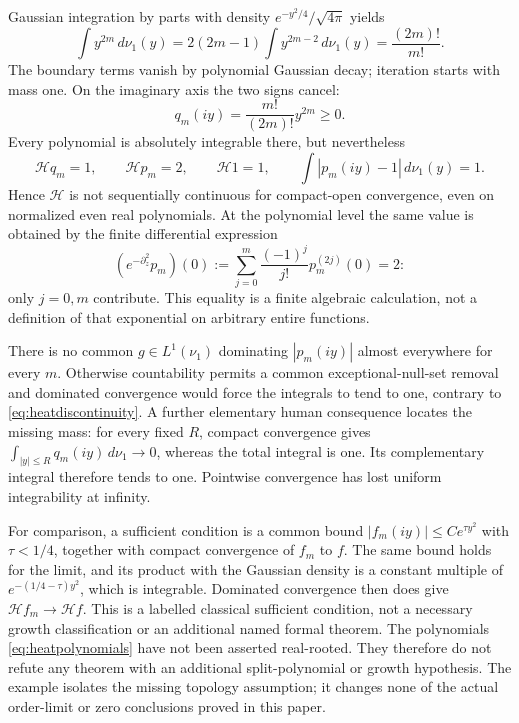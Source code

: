 \documentclass[11pt]{article}
\theoremstyle{remark}\newtheorem{remark}[theorem]{Remark}
\begin{document}
Gaussian integration by parts with density
$e^{-y^2/4}/\sqrt{4\pi}$ yields
\[
 \int y^{2m}\,d\nu_1(y)=2(2m-1)\int y^{2m-2}\,d\nu_1(y)
                         =\frac{(2m)!}{m!}.
\]
The boundary terms vanish by polynomial Gaussian decay; iteration
starts with mass one. On the imaginary axis the two signs cancel:
\[
 q_m(iy)=\frac{m!}{(2m)!}y^{2m}\geq0.
\]
Every polynomial is absolutely integrable there, but nevertheless
\begin{equation}\label{eq:heatdiscontinuity}
 \mathcal Hq_m=1,\qquad \mathcal Hp_m=2,\qquad
 \mathcal H1=1,\qquad \int |p_m(iy)-1|\,d\nu_1(y)=1.
\end{equation}
Hence $\mathcal H$ is not sequentially continuous for compact-open
convergence, even on normalized even real polynomials. At the
polynomial level the same value is obtained by the finite differential
expression
\[
 (e^{-\partial_z^2}p_m)(0)
 :=\sum_{j=0}^{m}\frac{(-1)^j}{j!}p_m^{(2j)}(0)=2:
\]
only $j=0,m$ contribute. This equality is a finite algebraic
calculation, not a definition of that exponential on arbitrary entire
functions.

There is no common $g\in L^1(\nu_1)$ dominating $|p_m(iy)|$
almost everywhere for every $m$. Otherwise countability permits a
common exceptional-null-set removal and dominated convergence would
force the integrals to tend to one, contrary to
\eqref{eq:heatdiscontinuity}. A further elementary human consequence
locates the missing mass: for every fixed $R$, compact convergence
gives $\int_{|y|\leq R}q_m(iy)\,d\nu_1\to0$, whereas the total
integral is one. Its complementary integral therefore tends to one.
Pointwise convergence has lost uniform integrability at infinity.

For comparison, a sufficient condition is a common bound
$|f_m(iy)|\leq C e^{\tau y^2}$ with $\tau<1/4$, together with
compact convergence of $f_m$ to $f$. The same bound holds for the
limit, and its product with the Gaussian density is a constant
multiple of $e^{-(1/4-\tau)y^2}$, which is integrable. Dominated
convergence then does give $\mathcal H f_m\to\mathcal H f$.
This is a labelled classical sufficient condition, not a necessary
growth classification or an additional named formal theorem.
The polynomials \eqref{eq:heatpolynomials} have not been asserted
real-rooted. They therefore do not refute any theorem with an
additional split-polynomial or growth hypothesis. The example
isolates the missing topology assumption; it changes none of the
actual order-limit or zero conclusions proved in this paper.
\end{document}
